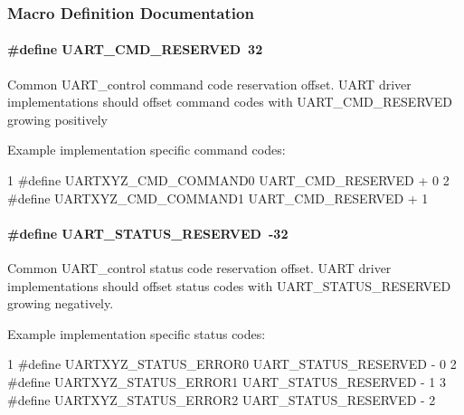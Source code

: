 \subsubsection{Macro Definition Documentation}
\paragraph[{U\+A\+R\+T\+\_\+\+C\+M\+D\+\_\+\+R\+E\+S\+E\+R\+V\+E\+D}]{\setlength{\rightskip}{0pt plus 5cm}\#define U\+A\+R\+T\+\_\+\+C\+M\+D\+\_\+\+R\+E\+S\+E\+R\+V\+E\+D~32}\label{group___u_a_r_t___c_o_n_t_r_o_l_ga0f5a809e0884da33fef102236eb51644}
Common U\+A\+R\+T\+\_\+control command code reservation offset. U\+A\+R\+T driver implementations should offset command codes with U\+A\+R\+T\+\_\+\+C\+M\+D\+\_\+\+R\+E\+S\+E\+R\+V\+E\+D growing positively

Example implementation specific command codes\+: 
\begin{DoxyCode}
1 #define UARTXYZ\_CMD\_COMMAND0     UART\_CMD\_RESERVED + 0
2 #define UARTXYZ\_CMD\_COMMAND1     UART\_CMD\_RESERVED + 1
\end{DoxyCode}
\paragraph[{U\+A\+R\+T\+\_\+\+S\+T\+A\+T\+U\+S\+\_\+\+R\+E\+S\+E\+R\+V\+E\+D}]{\setlength{\rightskip}{0pt plus 5cm}\#define U\+A\+R\+T\+\_\+\+S\+T\+A\+T\+U\+S\+\_\+\+R\+E\+S\+E\+R\+V\+E\+D~-\/32}\label{group___u_a_r_t___c_o_n_t_r_o_l_ga8f35027907fbab6a9ee302d2ee52a879}
Common U\+A\+R\+T\+\_\+control status code reservation offset. U\+A\+R\+T driver implementations should offset status codes with U\+A\+R\+T\+\_\+\+S\+T\+A\+T\+U\+S\+\_\+\+R\+E\+S\+E\+R\+V\+E\+D growing negatively.

Example implementation specific status codes\+: 
\begin{DoxyCode}
1 #define UARTXYZ\_STATUS\_ERROR0    UART\_STATUS\_RESERVED - 0
2 #define UARTXYZ\_STATUS\_ERROR1    UART\_STATUS\_RESERVED - 1
3 #define UARTXYZ\_STATUS\_ERROR2    UART\_STATUS\_RESERVED - 2
\end{DoxyCode}
 
